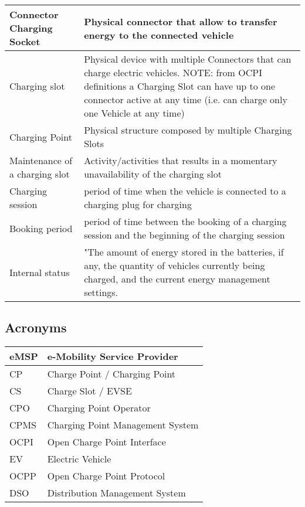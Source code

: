 \begin{tabular}{|p{5cm}|p{10cm}|}
	\hline
	Connector \newline Charging Socket & Physical connector that allow to transfer energy to the connected vehicle\\
	\hline
	Charging slot & Physical device with multiple Connectors that can charge electric vehicles.\newline
	NOTE: from OCPI definitions a Charging Slot can have up to one connector active at any time (i.e. can charge only one Vehicle at any time) \\
	\hline
	Charging Point & Physical structure composed by multiple Charging Slots\\
	\hline
	Maintenance of a charging slot & Activity/activities that results in a momentary unavailability of the charging slot\\
	\hline
	Charging session & period of time when the vehicle is connected to a charging plug for charging\\
	\hline
	Booking period & period of time between the booking of a charging session and the beginning of the charging session\\
	\hline
	Internal status & "The amount of energy stored in the batteries, if any, the quantity of vehicles currently being charged, and the current energy management settings. \\
	\hline
	
	
\end{tabular}

\subsection{Acronyms}
\begin{tabular}{|l|l|}
	\hline
	eMSP & e-Mobility Service Provider\\
	\hline
	CP & Charge Point / Charging Point\\
	\hline
	CS & Charge Slot / EVSE\\
	\hline
	CPO & Charging Point Operator\\
	\hline
	CPMS & Charging Point Management System\\
	\hline
	OCPI & Open Charge Point Interface\\
	\hline
	EV & Electric Vehicle\\
	\hline
	OCPP & Open Charge Point Protocol\\
	\hline
	DSO & Distribution Management System \\
	\hline
\end{tabular}

